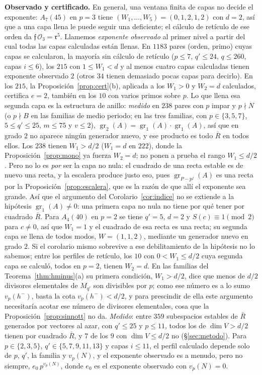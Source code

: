 \documentclass[11pt,a4paper]{article}
\theoremstyle{definition}
\newcommand{\cO}{\mathcal{O}}
\newcommand{\cf}{\mathfrak{f}}
\newcommand{\rad}{\mathfrak{r}}
\newcommand{\gr}{\operatorname{gr}}
\begin{document}
\noindent\textbf{Observado y certificado.} En general, una ventana finita de capas no decide el exponente:
$A_7(45)$ en $p=3$ tiene $(W_1,\dots,W_5)=(0,1,2,1,2)$ con $d=2$, así que a una capa llena le puede seguir una
deficiente; el cálculo de retículo de ese orden da $\cf\,\cO_3=\rad^5$. Llamemos \emph{exponente observado} al primer nivel a
partir del cual todas las capas calculadas están llenas. En $1183$ pares (orden, primo) cuyas capas se calcularon, la
mayoría sin cálculo de retículo ($p\le7$, $q'\le24$, $q\le260$, capas $i\le6$), los $215$ con $1\le W_1<d$ y al menos
cuatro capas calculadas tienen exponente observado $2$ (otros $34$ tienen demasiado pocas capas para decirlo). En los
$215$, la Proposición~\ref{prop:cert}(b), aplicada a los $W_1>0$ y $W_2=d$ calculados, certifica $e=2$, también en los
$10$ con varios primos sobre $p$. Lo que llena esa segunda capa es la estructura de anillo: \emph{medido} en
$238$ pares con $p$ impar y $p\nmid N$ (o $p\nmid B$ en las familias de medio periodo; en las tres familias, con
$p\in\{3,5,7\}$, $5\le q'\le25$, $m\le75$ y $v\le2$), $\gr_2(A)=\gr_1(A)\cdot\gr_1(A)$, así que en grado $2$ no aparece
ningún generador nuevo, y ese producto es todo $\bar R$ en todos ellos. Los $238$ tienen $W_1>d/2$ ($W_1=d$ en $222$),
donde la Proposición~\ref{prop:mono} ya fuerza $W_2=d$; no ponen a prueba el rango $W_1\le d/2$. Pero no lo es \emph{por} ser la capa no nula: el cuadrado de una recta
estable es de nuevo una recta, y la escalera produce justo eso, pues $\gr_{P-p^j}(A)$ es una recta por la
Proposición~\ref{prop:escalera}, que es la razón de que allí el exponente sea grande. Así que el argumento del
Corolario~\ref{cor:indice} no se extiende a la hipótesis $\gr_1(A)\neq0$: una primera capa no nula no tiene por qué
tener por cuadrado $\bar R$. Para $A_4(40)$ en $p=2$ se tiene $q'=5$, $d=2$ y $S(c)\equiv1\pmod2$ para $c\ne0$, así que
$W_1=1$ y el cuadrado de esa recta es una recta; su segunda capa se llena de todos modos, $W=(1,1,2)$,
mediante un generador nuevo en grado $2$. Si el corolario mismo sobrevive a ese debilitamiento de la hipótesis no lo sabemos; entre los perfiles de retículo, los $10$
con $0<W_1\le d/2$ cuya segunda capa se calculó, todos en $p=2$, tienen $W_2=d$. En las familias del Teorema~\ref{thm:hminus}(a) su primera condición, $W_1>d/2$, dice que menos de
$d/2$ divisores elementales de $M_{q'}$ son divisibles por $p$; como ese número es a lo sumo $v_p(h^-)$, basta la
cota $v_p(h^-)<d/2$, y para prescindir de ella este argumento necesitaría acotar ese número de divisores
elementales, cosa que la Proposición~\ref{prop:sinnott} no da. \emph{Medido}: entre $359$
subespacios estables de $\bar R$ generados por vectores al azar, con $q'\le25$ y $p\le11$, todos los de
$\dim V>d/2$ tienen por cuadrado $\bar R$, y $7$ de los $9$ con $\dim V\le d/2$ no (\S\ref{sec:metodo}).
Para $p\in\{2,3,5\}$, $q'\in\{5,7,9,11,13\}$ y capas $i\le11$, el perfil calculado
depende solo de $p$, $q'$, la familia y $v_p(N)$, y el exponente observado es a menudo, pero no siempre,
$e_0\,p^{v_p(N)}$, donde $e_0$ es el exponente observado con $v_p(N)=0$.
\end{document}

